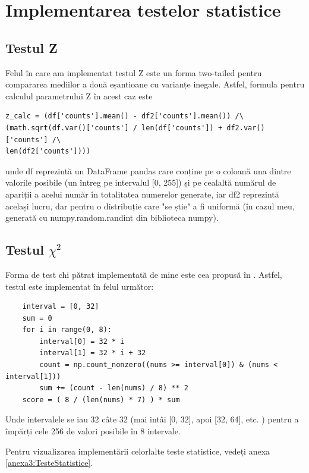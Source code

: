 \section{Implementarea testelor statistice}

\subsection{Testul Z}
Felul în care am implementat testul Z este un forma two-tailed pentru compararea mediilor a două eșantioane cu varianțe inegale. Astfel, formula pentru calculul parametrului Z în acest caz este
\begin{code}
\begin{verbatim}
z_calc = (df['counts'].mean() - df2['counts'].mean()) /\
(math.sqrt(df.var()['counts'] / len(df['counts']) + df2.var()['counts'] /\
len(df2['counts'])))
\end{verbatim}
\end{code}

unde df reprezintă un DataFrame pandas care conține pe o coloană una dintre valorile posibile (un întreg pe intervalul [0, 255]) și pe cealaltă numărul de apariții a acelui număr în totalitatea numerelor generate, iar df2 reprezintă același lucru, dar pentru o distribuție care "se știe" a fi uniformă (în cazul meu, generată cu numpy.random.randint din biblioteca numpy).
\subsection[Testul chi pătrat]{Testul $\chi^2$}
Forma de test chi pătrat implementată de mine este cea propusă în \cite{art:PetrilaMantaUnguranu:IEEESystheory:2014}. Astfel, testul este implementat în felul următor:

\begin{code}
\begin{verbatim}
    interval = [0, 32]
    sum = 0
    for i in range(0, 8):
        interval[0] = 32 * i
        interval[1] = 32 * i + 32
        count = np.count_nonzero((nums >= interval[0]) & (nums < interval[1]))
        sum += (count - len(nums) / 8) ** 2
    score = ( 8 / (len(nums) * 7) ) * sum
\end{verbatim}
\end{code}
Unde intervalele se iau 32 câte 32 (mai intâi [0, 32], apoi [32, 64], etc. ) pentru a împărți cele 256 de valori posibile în 8 intervale.

Pentru vizualizarea implementării celorlalte teste statistice, vedeți anexa \ref{anexa3:TesteStatistice}.

